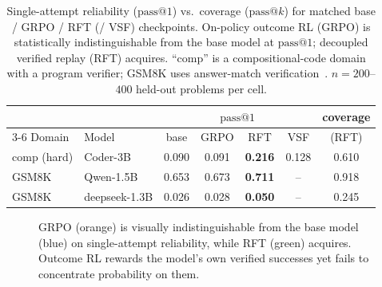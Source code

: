\begin{table}[htbp]
\centering
\caption{Single-attempt reliability ($\text{pass}@1$) vs.\ coverage ($\text{pass}@k$)
for matched base / GRPO / RFT (/ VSF) checkpoints. On-policy outcome RL (GRPO)
is statistically indistinguishable from the base model at $\text{pass}@1$;
decoupled verified replay (RFT) acquires. ``comp'' is a compositional-code
domain with a program verifier; GSM8K uses answer-match verification~\cite{cobbe2021gsm8k}.
$n{=}200$--$400$ held-out problems per cell.}
\label{tab:ladder}
\begin{tabular}{llccccc}
\toprule
 & & \multicolumn{4}{c}{$\text{pass}@1$} & coverage \\
\cmidrule(lr){3-6}
Domain & Model & base & GRPO & RFT & VSF & (RFT) \\
\midrule
comp (hard)   & Coder-3B   & 0.090 & 0.091 & \textbf{0.216} & 0.128 & 0.610 \\
GSM8K         & Qwen-1.5B  & 0.653 & 0.673 & \textbf{0.711} & --    & 0.918 \\
GSM8K         & deepseek-1.3B & 0.026 & 0.028 & \textbf{0.050} & -- & 0.245 \\
\bottomrule
\end{tabular}
\end{table}

\begin{figure}[htbp]
\centering
{}
\caption{GRPO (orange) is visually indistinguishable from the base model (blue)
on single-attempt reliability, while RFT (green) acquires. Outcome RL rewards the
model's own verified successes yet fails to concentrate probability on them.}
\label{fig:ladder}
\end{figure}

